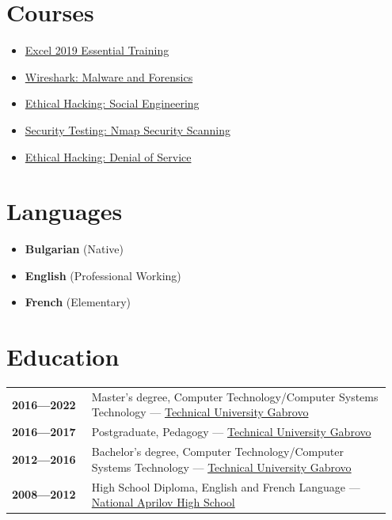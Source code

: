 \documentclass[letterpaper,10pt]{article}
\begin{document}
\begin{center}
	\begin{minipage}[t]{0.5\textwidth}
		\section*{Courses}
		\begin{itemize}
			\item \href{https://raw.githubusercontent.com/svetlyobg/LaTeX-CV/main/Excel%202019%20Essential%20Training.png}{Excel 2019 Essential Training}
			\item \href {https://raw.githubusercontent.com/svetlyobg/LaTeX-CV/main/Wireshark%20Malware%20and%20Forensics.png}{Wireshark: Malware and Forensics}
			\item \href{https://raw.githubusercontent.com/svetlyobg/LaTeX-CV/main/EthicalHackingSocialEngineering.png}{Ethical Hacking: Social Engineering}
			\item \href{https://raw.githubusercontent.com/svetlyobg/LaTeX-CV/main/SecurityTesting-NmapSecurityScanning.png}{Security Testing: Nmap Security Scanning}
			\item \href{https://raw.githubusercontent.com/svetlyobg/LaTeX-CV/main/EthicalHacking-DenialofService.png}{Ethical Hacking: Denial of Service}
		\end{itemize}
	\end{minipage}%
	\begin{minipage}[t]{0.5\textwidth}
		\section*{Languages}
		\begin{itemize}
			\item \textbf{Bulgarian} (Native)
			\item \textbf{English} (Professional Working)
			\item \textbf{French} (Elementary)
		\end{itemize}
		\newpage
		\section*{Education}
		\begin{tabular}{@{}p{0.2\linewidth} p{0.75\linewidth}}
			\textbf{2016—2022} & Master's degree, Computer Technology/Computer Systems Technology — \href{https://www.tugab.bg/en/}{Technical University Gabrovo} \\
			\textbf{2016—2017} & Postgraduate, Pedagogy — \href{https://www.tugab.bg/en/}{Technical University Gabrovo} \\
			\textbf{2012—2016} & Bachelor's degree, Computer Technology/Computer Systems Technology — \href{https://www.tugab.bg/en/}{Technical University Gabrovo} \\
			\textbf{2008—2012} & High School Diploma, English and French Language — \href{https://nag-school.org/}{National Aprilov High School} \\
		\end{tabular}
	\end{minipage}
\end{center}
			
\end{document}
